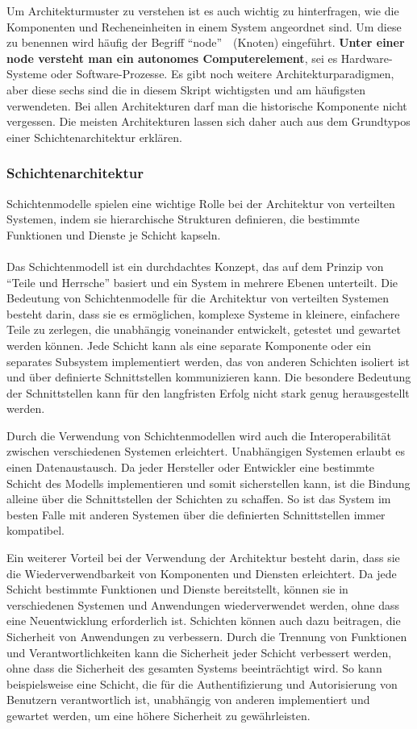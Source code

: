 Um Architekturmuster zu verstehen ist es auch wichtig zu hinterfragen, wie die Komponenten und Recheneinheiten in einem System angeordnet sind. Um diese zu benennen wird häufig der Begriff \enquote{node}~\cite{tanenbaum2017distributed}~(Knoten) eingeführt. \textbf{Unter einer node versteht man ein autonomes Computerelement}, sei es Hardware-Systeme oder Software-Prozesse. 
Es gibt noch weitere Architekturparadigmen, aber diese sechs sind die in diesem Skript wichtigsten und am häufigsten verwendeten. Bei allen Architekturen darf man die historische Komponente nicht vergessen. Die meisten Architekturen lassen sich daher auch aus dem Grundtypos einer Schichtenarchitektur erklären. 

\subsubsection{Schichtenarchitektur}

Schichtenmodelle spielen eine wichtige Rolle bei der Architektur von verteilten Systemen, indem sie hierarchische Strukturen definieren, die bestimmte Funktionen und Dienste je Schicht kapseln.
\\\\
Das Schichtenmodell ist ein durchdachtes Konzept, das auf dem Prinzip von \enquote{Teile und Herrsche} basiert und ein System in mehrere Ebenen unterteilt. Die Bedeutung von Schichtenmodelle für die Architektur von verteilten Systemen besteht darin, dass sie es ermöglichen, komplexe Systeme in kleinere, einfachere Teile zu zerlegen, die unabhängig voneinander entwickelt, getestet und gewartet werden können. Jede Schicht kann als eine separate Komponente oder ein separates Subsystem implementiert werden, das von anderen Schichten isoliert ist und über definierte Schnittstellen kommunizieren kann. Die besondere Bedeutung der Schnittstellen kann für den langfristen Erfolg nicht stark genug herausgestellt werden.

Durch die Verwendung von Schichtenmodellen wird auch die Interoperabilität zwischen verschiedenen Systemen erleichtert. Unabhängigen Systemen erlaubt es einen Datenaustausch. Da jeder Hersteller oder Entwickler eine bestimmte Schicht des Modells implementieren und somit sicherstellen kann, ist die Bindung alleine über die Schnittstellen der Schichten zu schaffen. So ist das System im besten Falle mit anderen Systemen über die definierten Schnittstellen immer kompatibel.

Ein weiterer Vorteil bei der Verwendung der Architektur besteht darin, dass sie die Wiederverwendbarkeit von Komponenten und Diensten erleichtert. Da jede Schicht bestimmte Funktionen und Dienste bereitstellt, können sie in verschiedenen Systemen und Anwendungen wiederverwendet werden, ohne dass eine Neuentwicklung erforderlich ist. Schichten können auch dazu beitragen, die Sicherheit von Anwendungen zu verbessern. Durch die Trennung von Funktionen und Verantwortlichkeiten kann die Sicherheit jeder Schicht verbessert werden, ohne dass die Sicherheit des gesamten Systems beeinträchtigt wird. So kann beispielsweise eine Schicht, die für die Authentifizierung und Autorisierung von Benutzern verantwortlich ist, unabhängig von anderen implementiert und gewartet werden, um eine höhere Sicherheit zu gewährleisten.

